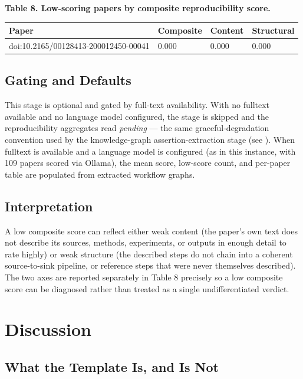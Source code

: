 \documentclass[
  english,
]{article}
\newcounter{none} %
\begin{document}
\textbf{Table 8. Low-scoring papers by composite reproducibility score.}

{\def\LTcaptype{none} %
\begin{longtable}[]{@{}llll@{}}
\toprule\noalign{}
Paper & Composite & Content & Structural \\
\midrule\noalign{}
\endhead
\bottomrule\noalign{}
\endlastfoot
doi:10.2165/00128413-200012450-00041 & 0.000 & 0.000 & 0.000 \\
\end{longtable}
}

\subsection{Gating and Defaults}\label{gating-and-defaults-1}

This stage is optional and gated by full-text availability. With no
fulltext available and no language model configured, the stage is
skipped and the reproducibility aggregates read \emph{pending} --- the
same graceful-degradation convention used by the knowledge-graph
assertion-extraction stage (see
\href{02d_methods_knowledge_graph.md}{}).
When fulltext is available and a language model is configured (as in
this instance, with 109 papers scored via Ollama), the mean score,
low-score count, and per-paper table are populated from extracted
workflow graphs.

\subsection{Interpretation}\label{interpretation-1}

A low composite score can reflect either weak content (the paper's own
text does not describe its sources, methods, experiments, or outputs in
enough detail to rate highly) or weak structure (the described steps do
not chain into a coherent source-to-sink pipeline, or reference steps
that were never themselves described). The two axes are reported
separately in Table 8 precisely so a low composite score can be
diagnosed rather than treated as a single undifferentiated verdict.

\newpage

\section{Discussion}\label{discussion}

\subsection{What the Template Is, and Is
Not}\label{what-the-template-is-and-is-not}
\end{document}
